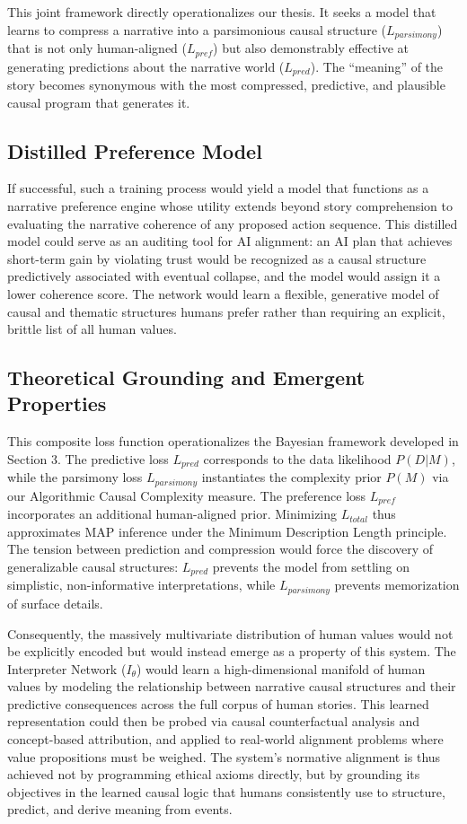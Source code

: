 \documentclass{article}
\theoremstyle{plain}
\theoremstyle{definition}
\theoremstyle{remark}
\begin{document}
This joint framework directly operationalizes our thesis. It seeks a model that learns to compress a narrative into a parsimonious causal structure ($L_{parsimony}$) that is not only human-aligned ($L_{pref}$) but also demonstrably effective at generating predictions about the narrative world ($L_{pred}$). The ``meaning'' of the story becomes synonymous with the most compressed, predictive, and plausible causal program that generates it.


\subsection{Distilled Preference Model}

If successful, such a training process would yield a model that functions as a narrative preference engine whose utility extends beyond story comprehension to evaluating the narrative coherence of any proposed action sequence. This distilled model could serve as an auditing tool for AI alignment: an AI plan that achieves short-term gain by violating trust would be recognized as a causal structure predictively associated with eventual collapse, and the model would assign it a lower coherence score. The network would learn a flexible, generative model of causal and thematic structures humans prefer rather than requiring an explicit, brittle list of all human values.

\subsection{Theoretical Grounding and Emergent Properties}
This composite loss function operationalizes the Bayesian framework developed in Section 3. The predictive loss $L_{pred}$ corresponds to the data likelihood $P(D|M)$, while the parsimony loss $L_{parsimony}$ instantiates the complexity prior $P(M)$ via our Algorithmic Causal Complexity measure. The preference loss $L_{pref}$ incorporates an additional human-aligned prior. Minimizing $L_{total}$ thus approximates MAP inference under the Minimum Description Length principle. The tension between prediction and compression would force the discovery of generalizable causal structures: $L_{pred}$ prevents the model from settling on simplistic, non-informative interpretations, while $L_{parsimony}$ prevents memorization of surface details.

Consequently, the massively multivariate distribution of human values would not be explicitly encoded but would instead emerge as a property of this system. The Interpreter Network ($I_\theta$) would learn a high-dimensional manifold of human values by modeling the relationship between narrative causal structures and their predictive consequences across the full corpus of human stories. This learned representation could then be probed via causal counterfactual analysis and concept-based attribution, and applied to real-world alignment problems where value propositions must be weighed. The system's normative alignment is thus achieved not by programming ethical axioms directly, but by grounding its objectives in the learned causal logic that humans consistently use to structure, predict, and derive meaning from events.
\end{document}
